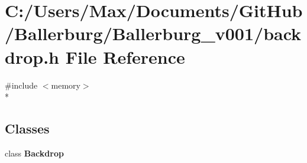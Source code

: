 \section{C\+:/\+Users/\+Max/\+Documents/\+Git\+Hub/\+Ballerburg/\+Ballerburg\+\_\+v001/backdrop.h File Reference}
\label{backdrop_8h}
{\ttfamily \#include $<$memory$>$}\\*
\subsection*{Classes}
\begin{DoxyCompactItemize}
\item 
class {\bf Backdrop}
\end{DoxyCompactItemize}
